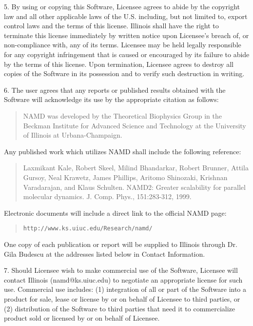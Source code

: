 5. By using or copying this Software, Licensee agrees to abide by the
copyright law and all other applicable laws of the U.S. including, but 
not limited to, export control laws and the terms of this license. 
Illinois shall have the right to terminate this license immediately by 
written notice upon Licensee's breach of, or non-compliance with, any 
of its terms. Licensee may be held legally responsible for any copyright 
infringement that is caused or encouraged by its failure to abide by 
the terms of this license. Upon termination, Licensee agrees to destroy 
all copies of the Software in its possession and to verify such 
destruction in writing.

6. The user agrees that any reports or published results obtained 
with the Software will acknowledge its use by the appropriate citation 
as follows: 

\begin{quote}
 NAMD was developed by the Theoretical Biophysics Group in the 
 Beckman Institute for Advanced Science and Technology at the 
 University of Illinois at Urbana-Champaign.
\end{quote}

Any published work which utilizes NAMD shall include the following reference: 

\begin{quote}
 Laxmikant Kale, Robert Skeel, Milind Bhandarkar, Robert Brunner,
 Attila Gursoy, Neal Krawetz, James Phillips, Aritomo Shinozaki,
 Krishnan Varadarajan, and Klaus Schulten. NAMD2: Greater scalability
 for parallel molecular dynamics.  J. Comp. Phys., 151:283-312, 1999.
\end{quote}

Electronic documents will include a direct link to the official NAMD page:

\begin{quote}
{\tt http://www.ks.uiuc.edu/Research/namd/}
\end{quote}

One copy of each publication or report will be supplied to Illinois 
through Dr. Gila Budescu at the addresses listed below in Contact 
Information.

7. Should Licensee wish to make commercial use of the Software, Licensee 
will contact Illinois (namd@ks.uiuc.edu) to negotiate an appropriate 
license for such use. Commercial use includes: (1) integration of all 
or part of the Software into a product for sale, lease or license by or 
on behalf of Licensee to third parties, or (2) distribution of the 
Software to third parties that need it to commercialize product sold or 
licensed by or on behalf of Licensee.


